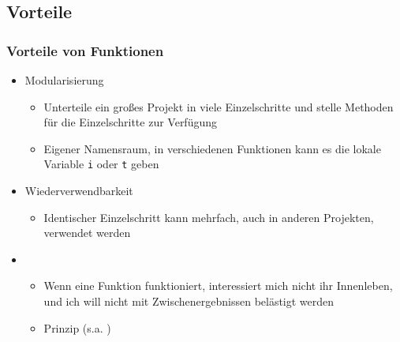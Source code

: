   \subsection{Vorteile}
  \begin{frame}
      \frametitle{Vorteile von Funktionen}
      \begin{itemize}
        \item Modularisierung
        \begin{itemize}
          \item Unterteile ein großes Projekt in viele Einzelschritte und stelle Methoden für die Einzelschritte zur Verfügung
          \item Eigener Namensraum, in verschiedenen Funktionen kann es die lokale Variable \texttt{i} oder \texttt{t} geben
        \end{itemize}
        \item Wiederverwendbarkeit
        \begin{itemize}
          \item Identischer Einzelschritt kann mehrfach, auch in anderen Projekten, verwendet werden
        \end{itemize}
        \item {}
        \begin{itemize}
          \item Wenn eine Funktion funktioniert, interessiert mich nicht ihr Innenleben, und ich will nicht mit Zwischenergebnissen belästigt werden
          \item {} Prinzip (s.a. )
        \end{itemize}
      \end{itemize}
  \end{frame}

